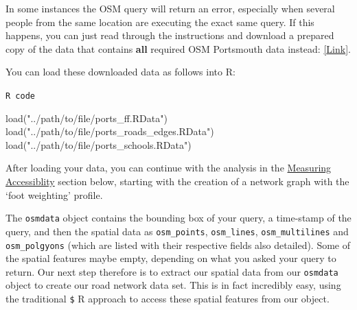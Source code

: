 \documentclass[
  letterpaper,
  DIV=11,
  numbers=noendperiod]{scrreprt}
\newenvironment{Shaded}{\begin{snugshade}}{\end{snugshade}}
\newcommand{\FunctionTok}[1]{\textcolor[rgb]{0.28,0.35,0.67}{#1}}
\newcommand{\NormalTok}[1]{\textcolor[rgb]{0.00,0.23,0.31}{#1}}
\newcommand{\StringTok}[1]{\textcolor[rgb]{0.13,0.47,0.30}{#1}}
\begin{document}
\begin{tcolorbox}[enhanced jigsaw, rightrule=.15mm, colback=white, opacityback=0, opacitybacktitle=0.6, coltitle=black, colbacktitle=quarto-callout-note-color!10!white, breakable, arc=.35mm, title=\textcolor{quarto-callout-note-color}{\faInfo}\hspace{0.5em}{Note}, left=2mm, leftrule=.75mm, bottomtitle=1mm, toprule=.15mm, bottomrule=.15mm, colframe=quarto-callout-note-color-frame, toptitle=1mm, titlerule=0mm]

In some instances the OSM query will return an error, especially when
several people from the same location are executing the exact same
query. If this happens, you can just read through the instructions and
download a prepared copy of the data that contains \textbf{all} required
OSM Portsmouth data instead:
\href{https://github.com/jtvandijk/GEOG0114/tree/master/data/zip/osm_portmouth.zip}{{[}Link{]}}.

You can load these downloaded data as follows into R:

\begin{codelisting}[H]

\caption{\texttt{R code}}

\begin{Shaded}
\begin{Highlighting}[]
\FunctionTok{load}\NormalTok{(}\StringTok{"../path/to/file/ports\_ff.RData"}\NormalTok{)}
\FunctionTok{load}\NormalTok{(}\StringTok{"../path/to/file/ports\_roads\_edges.RData"}\NormalTok{)}
\FunctionTok{load}\NormalTok{(}\StringTok{"../path/to/file/ports\_schools.RData"}\NormalTok{)}
\end{Highlighting}
\end{Shaded}

\end{codelisting}

After loading your data, you can continue with the analysis in the
\protect\hyperlink{osm}{Measuring Accessiblity} section below, starting
with the creation of a network graph with the `foot weighting' profile.

\end{tcolorbox}

The \texttt{osmdata} object contains the bounding box of your query, a
time-stamp of the query, and then the spatial data as
\texttt{osm\_points}, \texttt{osm\_lines}, \texttt{osm\_multilines} and
\texttt{osm\_polgyons} (which are listed with their respective fields
also detailed). Some of the spatial features maybe empty, depending on
what you asked your query to return. Our next step therefore is to
extract our spatial data from our \texttt{osmdata} object to create our
road network data set. This is in fact incredibly easy, using the
traditional \texttt{\$} R approach to access these spatial features from
our object.
\end{document}
